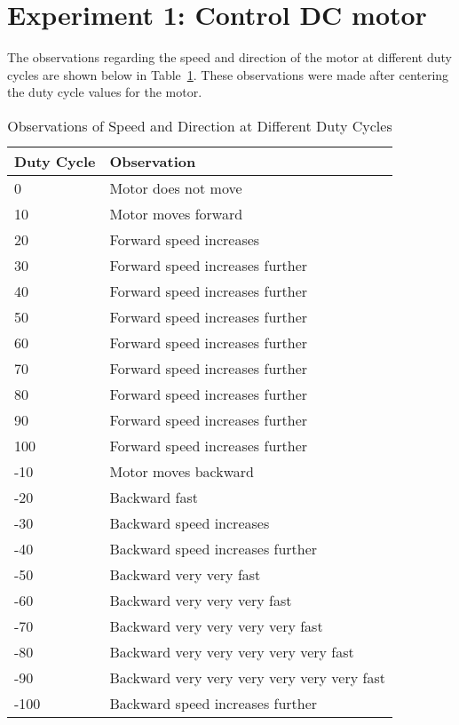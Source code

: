 \section*{Experiment 1: Control DC motor}
The observations regarding the speed and direction of the motor at different duty cycles are shown below in Table~\ref{tab:exp1}. These observations were made after centering the duty cycle values for the motor. 
\begin{table}[htp]
\centering
\caption[exp1]{Observations of Speed and Direction at Different Duty Cycles}
\label{tab:exp1}
\begin{tabular}{|l|l|}
\hline
Duty Cycle & Observation                                 \\ \hline
0          & Motor does not move                         \\ \hline
10         & Motor moves forward                         \\ \hline
20         & Forward speed increases                     \\ \hline
30         & Forward speed increases further             \\ \hline
40         & Forward speed increases further             \\ \hline
50         & Forward speed increases further             \\ \hline
60         & Forward speed increases further             \\ \hline
70         & Forward speed increases further             \\ \hline
80         & Forward speed increases further             \\ \hline
90         & Forward speed increases further             \\ \hline
100        & Forward speed increases further             \\ \hline
-10        & Motor moves backward                        \\ \hline
-20        & Backward fast                               \\ \hline
-30        & Backward speed increases                    \\ \hline
-40        & Backward speed increases further            \\ \hline
-50        & Backward very very fast                     \\ \hline
-60        & Backward very very very fast                \\ \hline
-70        & Backward very very very very fast           \\ \hline
-80        & Backward very very very very very fast      \\ \hline
-90        & Backward very very very very very very fast \\ \hline
-100       & Backward speed increases further            \\ \hline
\end{tabular}
\end{table}